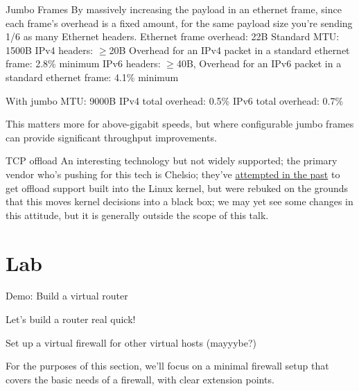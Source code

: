 \documentclass[bigger,aspectratio=169]{beamer}
\begin{document}
\begin{frame}{Jumbo Frames}
  By massively increasing the payload in an ethernet frame, since each frame's overhead is a fixed amount, for the same
  payload size you're sending 1/6 as many Ethernet headers.
  Ethernet frame overhead: 22B
  Standard MTU: 1500B
  IPv4 headers: $\geq$20B
  Overhead for an IPv4 packet in a standard ethernet frame: 2.8\% minimum
  IPv6 headers: $\geq$40B,
  Overhead for an IPv6 packet in a standard ethernet frame: 4.1\% minimum

  With jumbo MTU: 9000B
  IPv4 total overhead: 0.5\%
  IPv6 total overhead: 0.7\%

  This matters more for above-gigabit speeds, but where configurable jumbo frames can provide significant throughput improvements.

\end{frame}

\begin{frame}[label={sec:orgc8262cc}]{TCP offload}
An interesting technology but not widely supported; the primary vendor who's
pushing for this tech is Chelsio; they've \href{https://lwn.net/Articles/148697/}{attempted in the past} to get offload
support built into the Linux kernel, but were rebuked on the grounds that this
moves kernel decisions into a black box; we may yet see some changes in this
attitude, but it is generally outside the scope of this talk.
\end{frame}

\section{Lab}
\label{sec:org475924a}
\begin{frame}{Demo: Build a virtual router}
  
Let's build a router real quick!

Set up a virtual firewall for other virtual hosts (mayyybe?)

For the purposes of this section, we'll focus on a minimal firewall setup that
covers the basic needs of a firewall, with clear extension points.
\end{frame}
\end{document}
